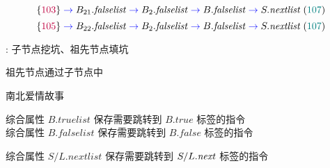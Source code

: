 \begin{frame}{}
  \[
    \{\textcolor{purple}{103}\}
      \textcolor{blue}{\;\to\;} {B_{21}.\mathit{falselist}}
      \textcolor{blue}{\;\to\;} {B_{2}.\mathit{falselist}}
      \textcolor{blue}{\;\to\;} {B.\mathit{falselist}}
      \textcolor{blue}{\;\to\;} {S.\mathit{nextlist}}
      \;(\textcolor{teal}{107})
  \]
  \[
    \{\textcolor{purple}{105}\}
      \textcolor{blue}{\;\to\;} {B_{22}.\mathit{falselist}}
      \textcolor{blue}{\;\to\;} {B_{2}.\mathit{falselist}}
      \textcolor{blue}{\;\to\;} {B.\mathit{falselist}}
      \textcolor{blue}{\;\to\;} {S.\mathit{nextlist}}
      \;(\textcolor{teal}{107})
  \]


  \pause
\end{frame}

\begin{frame}{}
  \begin{center}
    : {子节点挖坑、祖先节点填坑}


    \pause
    \vspace{0.40cm}
    祖先节点通过子节点中

    \vspace{0.20cm}
  \end{center}
\end{frame}

\begin{frame}{}
  \begin{center}
    南北爱情故事

  \end{center}
\end{frame}

\begin{frame}{}
\end{frame}

\begin{frame}{}
\end{frame}

\begin{frame}{}
  \begin{center}
    综合属性 {$B.\mathit{truelist}$ 保存{需要跳转到 $B.\mathit{true}$ 标签}的{指令}} \\[5pt]
    综合属性 {$B.\mathit{falselist}$ 保存{需要跳转到 $B.\mathit{false}$ 标签}的{指令}}


    综合属性 {$S/L.\mathit{nextlist}$} 保存{需要跳转到 $S/L.\mathit{next}$ 标签的指令}
  \end{center}
\end{frame}

